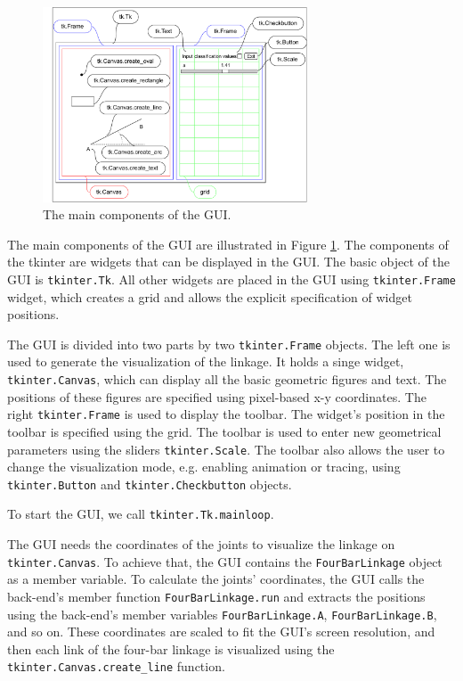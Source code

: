 \documentclass{article}
\begin{document}
\begin{figure}[h]
	\begin{center}
		\includegraphics[width=0.7\textwidth]{./figures/tkinter_grid.pdf}
	\end{center}
	\caption{The main components of the GUI.}
	\label{fig:tkinter_parts}
\end{figure}

The main components of the GUI are illustrated in Figure \ref{fig:tkinter_parts}. The components of the tkinter are widgets that can be displayed in the GUI. The basic object of the GUI is \texttt{tkinter.Tk}. All other widgets are placed in the GUI using \texttt{tkinter.Frame} widget, which creates a grid and allows the explicit specification of widget positions.

The GUI is divided into two parts by two \texttt{tkinter.Frame} objects. The left one is used to generate the visualization of the linkage. It holds a singe widget, \texttt{tkinter.Canvas}, which can display all the basic geometric figures and text. The positions of these figures are specified using pixel-based x-y coordinates. The right \texttt{tkinter.Frame} is used to display the toolbar. The widget's position in the toolbar is specified using the grid. The toolbar is used to enter new geometrical parameters using the sliders \texttt{tkinter.Scale}. The toolbar also allows the user to change the visualization mode, e.g. enabling animation or tracing, using \texttt{tkinter.Button} and \texttt{tkinter.Checkbutton} objects.

To start the GUI, we call \texttt{tkinter.Tk.mainloop}.

The GUI needs the coordinates of the joints to visualize the linkage on \texttt{tkinter.Canvas}. To achieve that, the GUI contains the \texttt{FourBarLinkage} object as a member variable. To calculate the joints' coordinates, the GUI calls the back-end's member function \texttt{FourBarLinkage.run} and extracts the positions using the back-end's member variables \texttt{FourBarLinkage.A}, \texttt{FourBarLinkage.B}, and so on. These coordinates are scaled to fit the GUI's screen resolution, and then each link of the four-bar linkage is visualized using the \texttt{tkinter.Canvas.create\_line} function.
\end{document}
